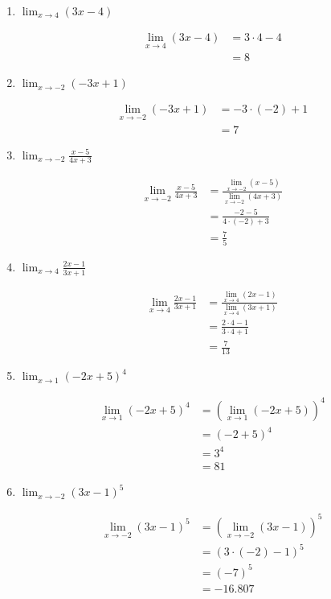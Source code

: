 \documentclass[a4paper, 12pt]{article}
\begin{document}
\begin{enumerate}
\begin{enumerate}
        \item $\lim_{x \to 4}(3x-4)$
        
        \begin{align*}
            \lim_{x \to 4}(3x-4) &= 3\cdot 4 -4 \tag*{[l. pol.]}\\
            &= 8
        \end{align*}

        \item $\lim_{x \to -2}(-3x+1)$
        
        \begin{align*}
            \lim_{x \to -2}(-3x+1) &= -3 \cdot (-2) +1 \tag*{[l. pol.]} \\
            &= 7
        \end{align*}

        \item $\lim_{x \to -2} \frac{x-5}{4x+3}$
        
        \begin{align*}
            \lim_{x \to -2} \frac{x-5}{4x+3} &= \frac{\lim_{x \to -2}(x-5)}{\lim_{x \to -2}(4x+3)} \tag*{[l. quo.]}\\
            &= \frac{-2-5}{4\cdot (-2)+3} \tag*{l. pol.} \\
            &= \frac{7}{5}
        \end{align*}

        \item $\lim_{x \to 4} \frac{2x -1}{3x+1}$
        
        \begin{align*}
            \lim_{x \to 4} \frac{2x -1}{3x+1} &= \frac{\lim_{x \to 4}(2x -1)}{\lim_{x \to 4}(3x+1)} \tag*{[l. quo.]}\\
            &= \frac{2\cdot 4 -1}{3\cdot 4+1} \tag*{[l. pol.]}\\
            &= \frac{7}{13}
        \end{align*}

        \item $\lim_{x \to 1} (-2x +5)^4$
        
        \begin{align*}
            \lim_{x \to 1} (-2x +5)^4 &= \left( \lim_{x \to 1} (-2x +5)  \right)^4 \tag*{[l. pot.]}\\
            &= (-2 +5)^4 \tag*{[l. pol.]}\\
            &= 3^4 \\
            &= 81
        \end{align*}

        \item $\lim_{x \to -2} (3x - 1)^5$
        
        \begin{align*}
            \lim_{x \to -2} (3x - 1)^5 &= \left( \lim_{x \to -2} (3x - 1) \right)^5 \tag*{[l. pot.]}\\
            &= (3 \cdot (-2) - 1)^5 \tag*{[l. pol.]}\\
            &= (-7)^5\\
            &= -16.807
        \end{align*}
    \end{enumerate}
\end{enumerate}
\end{document}
